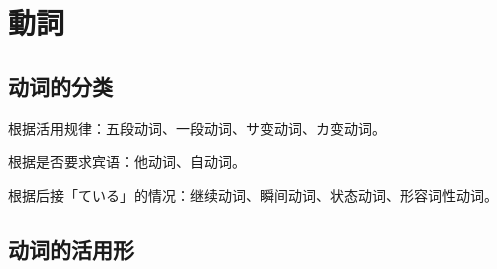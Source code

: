 \section{動詞}%


\subsection{动词的分类}%

\noindent 根据活用规律：五段动词、一段动词、サ变动词、カ变动词。

\noindent 根据是否要求宾语：他动词、自动词。

\noindent 根据后接「ている」的情况：继续动词、瞬间动词、状态动词、形容词性动词。



\subsection{动词的活用形}%

